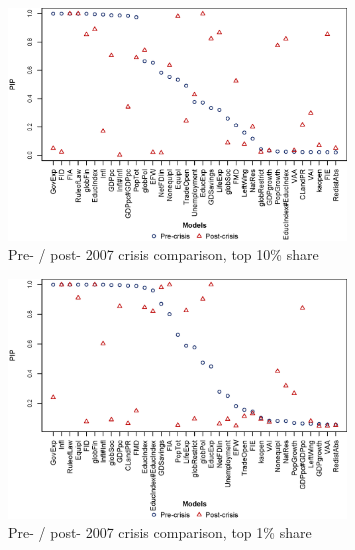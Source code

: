\begin{enumerate}[resume]
    \begin{figure}[ht!]
      \caption{Pre- / post- 2007 crisis comparison, top 10\% share}
      \label{ch4fig:comp_prepostcrisis_top10}
      \centering
      \includegraphics[width=0.8\textwidth, keepaspectratio]{Figures/ch4/comp_prepostcrisis_top10}
    \end{figure}

    \begin{figure}[ht!]
      \caption{Pre- / post- 2007 crisis comparison, top 1\% share}
      \label{ch4fig:comp_prepostcrisis_top1}
      \centering
      \includegraphics[width=0.8\textwidth, keepaspectratio]{Figures/ch4/comp_prepostcrisis_top1}
    \end{figure}


\end{enumerate}
